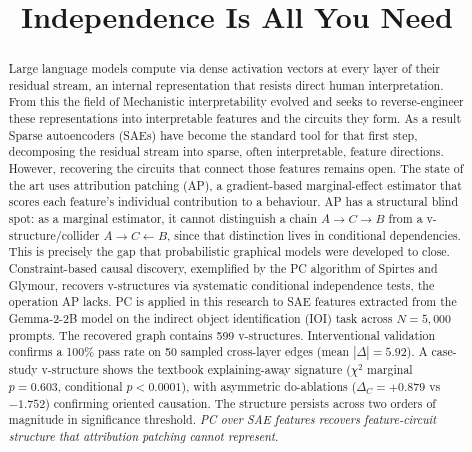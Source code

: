 \documentclass[conference]{IEEEtran}
\begin{document}
\title{Independence Is All You Need}

\author{
}

\maketitle

\begin{abstract}
Large language models compute via dense activation vectors at every layer of their residual stream, an internal representation that resists direct human interpretation. From this the field of Mechanistic interpretability evolved and seeks to reverse-engineer these representations into interpretable features and the circuits they form. As a result Sparse autoencoders (SAEs) have become the standard tool for that first step, decomposing the residual stream into sparse, often interpretable, feature directions. However, recovering the circuits that connect those features remains open. The state of the art uses attribution patching (AP), a gradient-based marginal-effect estimator that scores each feature's individual contribution to a behaviour. AP has a structural blind spot: as a marginal estimator, it cannot distinguish a chain $A \to C \to B$ from a v-structure/collider $A \to C \leftarrow B$, since that distinction lives in conditional dependencies. This is precisely the gap that probabilistic graphical models were developed to close. Constraint-based causal discovery, exemplified by the PC algorithm of Spirtes and Glymour, recovers v-structures via systematic conditional independence tests, the operation AP lacks. PC is applied in this research to SAE features extracted from the Gemma-2-2B model on the indirect object identification (IOI) task across $N = 5{,}000$ prompts. The recovered graph contains 599 v-structures. Interventional validation confirms a 100\% pass rate on 50 sampled cross-layer edges (mean $|\Delta| = 5.92$). A case-study v-structure shows the textbook explaining-away signature ($\chi^2$ marginal $p = 0.603$, conditional $p < 0.0001$), with asymmetric do-ablations ($\Delta_C = +0.879$ vs $-1.752$) confirming oriented causation. The structure persists across two orders of magnitude in significance threshold. \emph{PC over SAE features recovers feature-circuit structure that attribution patching cannot represent.}
\end{abstract}
\end{document}
